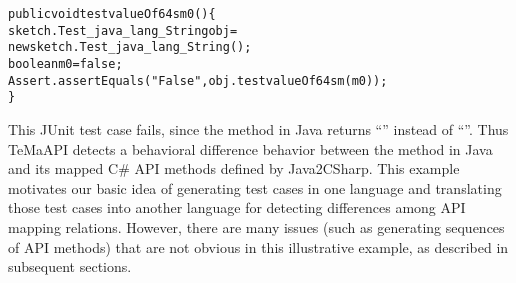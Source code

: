 \begin{CodeOut}%
\begin{alltt}
  public void testvalueOf64sm0()\{
    sketch.Test_java_lang_String obj =
          new sketch.Test_java_lang_String();
    boolean m0 = false;
    Assert.assertEquals("False", obj.testvalueOf64sm(m0));
  \}
\end{alltt}
\end{CodeOut}

This JUnit test case fails, since the  method in Java returns ``'' instead of ``''. Thus TeMaAPI detects a behavioral difference behavior between the  method in Java and its mapped C\# API methods defined by Java2CSharp. This example motivates our basic idea of generating test cases in one language and translating those test cases into another language for detecting differences among API mapping relations. However, there are many issues (such as generating sequences of API methods) that are not obvious in this illustrative example, as described in subsequent sections.


